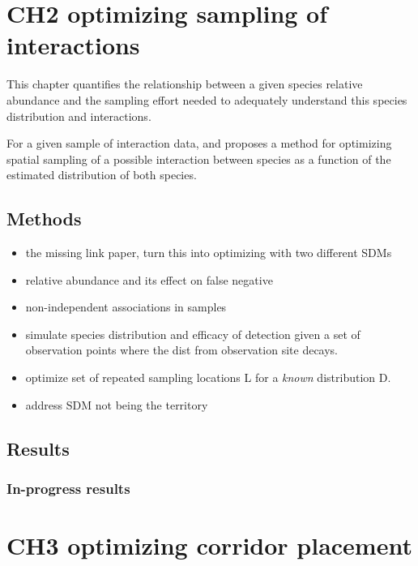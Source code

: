 \documentclass[10pt,oneside]{article}
\begin{document}
\hypertarget{ch2-optimizing-sampling-of-interactions}{%
\section{CH2 optimizing sampling of
interactions}\label{ch2-optimizing-sampling-of-interactions}}

This chapter quantifies the relationship between a given species
relative abundance and the sampling effort needed to adequately
understand this species distribution and interactions.

For a given sample of interaction data, and proposes a method for
optimizing spatial sampling of a possible interaction between species as
a function of the estimated distribution of both species.

\hypertarget{methods-1}{%
\subsection{Methods}\label{methods-1}}

\begin{itemize}
\item
  the missing link paper, turn this into optimizing with two different
  SDMs
\item
  relative abundance and its effect on false negative
\item
  non-independent associations in samples
\item
  simulate species distribution and efficacy of detection given a set of
  observation points where the dist from observation site decays.
\item
  optimize set of repeated sampling locations L for a \emph{known}
  distribution D.
\item
  address SDM not being the territory
\end{itemize}

\hypertarget{results}{%
\subsection{Results}\label{results}}

\hypertarget{in-progress-results}{%
\subsubsection{In-progress results}\label{in-progress-results}}

\hypertarget{ch3-optimizing-corridor-placement}{%
\section{CH3 optimizing corridor
placement}\label{ch3-optimizing-corridor-placement}}
\end{document}
